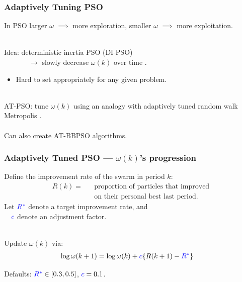 \documentclass[xcolor=dvipsnames]{beamer}
\begin{document}
\begin{frame}
\frametitle{Adaptively Tuning PSO}
In PSO larger $\omega$ $\implies$ more exploration, smaller $\omega$ $\implies$ more exploitation.\\~\\

\pause

Idea: deterministic inertia PSO (DI-PSO) \\
\ \ \ \ \ \ \ $\to$ slowly decrease $\omega(k)$ over time \citep{eberhart2000comparing}.
\begin{itemize}
\item Hard to set appropriately for any given problem.\\~\\
\end{itemize}

\pause

AT-PSO: tune $\omega(k)$ using an analogy with adaptively tuned random walk Metropolis \citep{andrieu2008tutorial}.\\~\\

Can also create AT-BBPSO algorithms.
\end{frame}


\begin{frame}
\frametitle{Adaptively Tuned PSO --- $\omega(k)$'s progression}
Define the improvement rate of the swarm in period $k$:
\begin{align*}
R(k) = &&  \mbox{proportion of particles that improved}\\
       &&  \mbox{on their personal best last period.}
\end{align*}
\pause
Let ${\color{blue}R^*}$ denote a target improvement rate, and\\
\ \ ${\color{blue}c}$ denote an adjustment factor.\\~

Update $\omega(k)$ via:
\begin{align*}
\log \omega(k+1) &= \log\omega(k) + {\color{blue}c}\{R(k+1) - {\color{blue}R^*}\}
\end{align*}

\pause

Defaults: ${\color{blue}R^*}\in[0.3, 0.5]$, ${\color{blue}c} = 0.1$.
\end{frame}
\end{document}
